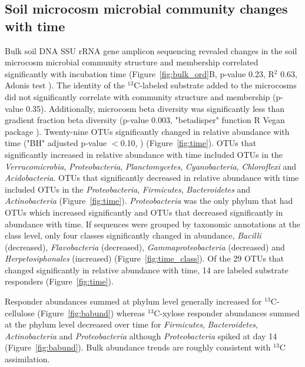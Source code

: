 \subsection{Soil microcosm microbial community changes with time}
Bulk soil DNA SSU rRNA gene amplicon sequencing revealed changes in the soil
microcosm microbial community structure and membership correlated significantly
with incubation time (Figure~\ref{fig:bulk_ord}B, p-value 0.23, R$^{2}$ 0.63,
Adonis test \citep{Anderson2001a}). The identity of the $^{13}$C-labeled
substrate added to the microcosms did not significantly correlate with
community structure and membership (p-value 0.35). Additionally, microcosm beta
diversity was significantly less than gradient fraction beta diversity (p-value
0.003, "betadisper" function R Vegan package
\citep{Anderson2006,oksanen2007vegan}). Twenty-nine OTUs significantly changed
in relative abundance with time ("BH" adjusted p-value $<$0.10,
\citep{YBenjamini1995}) (Figure~\ref{fig:time}). OTUs that significantly
increased in relative abundance with time included OTUs in the
\textit{Verrucomicrobia}, \textit{Proteobacteria}, \textit{Planctomycetes},
\textit{Cyanobacteria}, \textit{Chloroflexi} and \textit{Acidobacteria}. OTUs
that significantly decreased in relative abundance with time included OTUs in
the \textit{Proteobacteria}, \textit{Firmicutes}, \textit{Bacteroidetes} and
\textit{Actinobacteria} (Figure~\ref{fig:time}). \textit{Proteobacteria} was
the only phylum that had OTUs which increased significantly and OTUs that
decreased significantly in abundance with time. If sequences were grouped by
taxonomic annotations at the class level, only four classes significantly
changed in abundance, \textit{Bacilli} (decreased), \textit{Flavobacteria}
(decreased), \textit{Gammaproteobacteria} (decreased) and
\textit{Herpetosiphonales} (increased) (Figure~\ref{fig:time_class}). Of the
29 OTUs that changed significantly in relative abundance with time, 14 are
labeled substrate responders (Figure~\ref{fig:time}).
   
Responder abundances summed at phylum level generally increased for
$^{13}$C-cellulose (Figure~\ref{fig:babund}) whereas $^{13}$C-xylose
responder abundances summed at the phylum level decreased over time for
\textit{Firmicutes}, \textit{Bacteroidetes}, \textit{Actinobacteria} and
\textit{Proteobacteria} although \textit{Proteobacteria} spiked at day 14
(Figure~\ref{fig:babund}). Bulk abundance trends are roughly consistent
with $^{13}$C assimilation.

